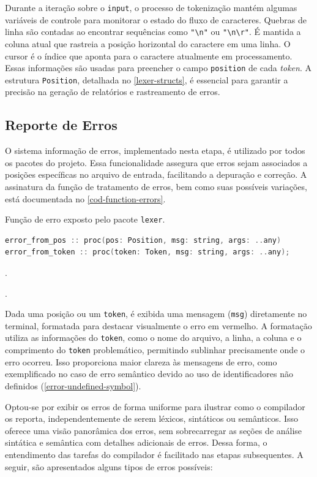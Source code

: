 Durante a iteração sobre o \texttt{input}, o processo de tokenização mantém algumas variáveis de controle para monitorar o estado do fluxo de caracteres. Quebras de linha são contadas ao encontrar sequências como \verb|"\n"| ou \verb|"\n\r"|. É mantida a coluna atual que rastreia a posição horizontal do caractere em uma linha. O cursor é o índice que aponta para o caractere atualmente em processamento. Essas informações são usadas para preencher o campo \texttt{position} de cada \textit{token}. A estrutura \texttt{Position}, detalhada no \autoref{lexer-structs}, é essencial para garantir a precisão na geração de relatórios e rastreamento de erros.

\subsection{Reporte de Erros} \label{subsection-erros}

O sistema informação de erros, implementado nesta etapa, é utilizado por todos os pacotes do projeto. Essa funcionalidade assegura que erros sejam associados a posições específicas no arquivo de entrada, facilitando a depuração e correção. A assinatura da função de tratamento de erros, bem como suas possíveis variações, está documentada no \autoref{cod-function-errors}.

\begin{codigo}[H]
    \caption{\small Função de erro exposto pelo pacote \texttt{lexer}. }
        \label{cod-function-errors}
\begin{lstlisting}[language=C++]
error_from_pos :: proc(pos: Position, msg: string, args: ..any)
error_from_token :: proc(token: Token, msg: string, args: ..any);
\end{lstlisting}.
\end{codigo}.



Dada uma posição ou um \texttt{token}, é exibida uma mensagem (\texttt{msg}) diretamente no terminal, formatada para destacar visualmente o erro em vermelho. A formatação utiliza as informações do \texttt{token}, como o nome do arquivo, a linha, a coluna e o comprimento do \texttt{token} problemático, permitindo sublinhar precisamente onde o erro ocorreu. Isso proporciona maior clareza às mensagens de erro, como exemplificado no caso de erro semântico devido ao uso de identificadores não definidos (\autoref{error-undefined-symbol}).

Optou-se por exibir os erros de forma uniforme para ilustrar como o compilador os reporta, independentemente de serem léxicos, sintáticos ou semânticos. Isso oferece uma visão panorâmica dos erros, sem sobrecarregar as seções de análise sintática e semântica com detalhes adicionais de erros. Dessa forma, o entendimento das tarefas do compilador é facilitado nas etapas subsequentes. A seguir, são apresentados alguns tipos de erros possíveis:

